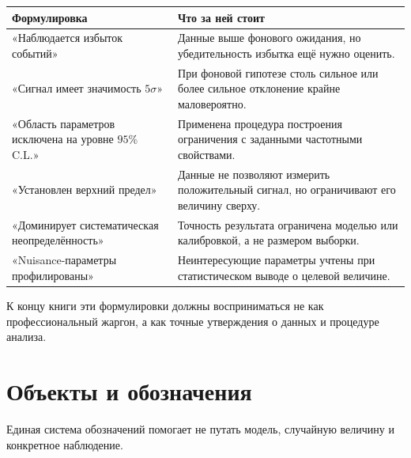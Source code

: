 \documentclass[
  russian,
  12pt,
  a4paper,
  a4paper,
  openany]{scrbook}
\newcounter{none} %
\begin{document}
{\def\LTcaptype{none} %
\begin{longtable}[]{@{}
  >{\raggedright\arraybackslash}p{}
  >{\raggedright\arraybackslash}p{}@{}}
\toprule\noalign{}
\begin{minipage}[b]{\linewidth}\raggedright
Формулировка
\end{minipage} & \begin{minipage}[b]{\linewidth}\raggedright
Что за ней стоит
\end{minipage} \\
\midrule\noalign{}
\endhead
\bottomrule\noalign{}
\endlastfoot
«Наблюдается избыток событий» & Данные выше фонового ожидания, но
убедительность избытка ещё нужно оценить. \\
«Сигнал имеет значимость \(5\sigma\)» & При фоновой гипотезе столь
сильное или более сильное отклонение крайне маловероятно. \\
«Область параметров исключена на уровне \(95\%\) C.L.» & Применена
процедура построения ограничения с заданными частотными свойствами. \\
«Установлен верхний предел» & Данные не позволяют измерить положительный
сигнал, но ограничивают его величину сверху. \\
«Доминирует систематическая неопределённость» & Точность результата
ограничена моделью или калибровкой, а не размером выборки. \\
«Nuisance-параметры профилированы» & Неинтересующие параметры учтены при
статистическом выводе о целевой величине. \\
\end{longtable}
}

К концу книги эти формулировки должны восприниматься не как
профессиональный жаргон, а как точные утверждения о данных и процедуре
анализа.

\section{Объекты и
обозначения}\label{ux43eux431ux44aux435ux43aux442ux44b-ux438-ux43eux431ux43eux437ux43dux430ux447ux435ux43dux438ux44f}

Единая система обозначений помогает не путать модель, случайную величину
и конкретное наблюдение.
\end{document}
